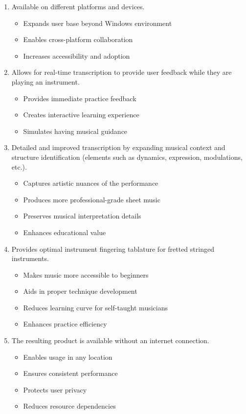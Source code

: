 \documentclass{article}
\begin{document}
\begin{enumerate}
    \item Available on different platforms and devices.
    \begin{itemize}
        \item Expands user base beyond Windows environment
        \item Enables cross-platform collaboration
        \item Increases accessibility and adoption
    \end{itemize}

    \item Allows for real-time transcription to provide user feedback while they are playing an
    instrument.
    \begin{itemize}
        \item Provides immediate practice feedback
        \item Creates interactive learning experience
        \item Simulates having musical guidance
    \end{itemize}

    \item Detailed and improved transcription by expanding musical context and
    structure identification (elements such as dynamics, expression, modulations, etc.).
    \begin{itemize}
        \item Captures artistic nuances of the performance
        \item Produces more professional-grade sheet music
        \item Preserves musical interpretation details
        \item Enhances educational value
    \end{itemize}

    \item Provides optimal instrument fingering tablature for fretted stringed instruments.
    \begin{itemize}
        \item Makes music more accessible to beginners
        \item Aids in proper technique development
        \item Reduces learning curve for self-taught musicians
        \item Enhances practice efficiency
    \end{itemize}

    \item The resulting product is available without an internet connection.
    \begin{itemize}
        \item Enables usage in any location
        \item Ensures consistent performance
        \item Protects user privacy
        \item Reduces resource dependencies
    \end{itemize}
\end{enumerate}
\end{document}
